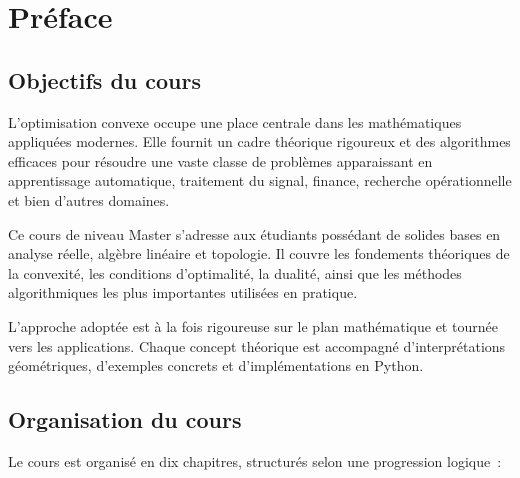 \chapter*{Pr\'eface}

\section*{Objectifs du cours}

L'optimisation convexe occupe une place centrale dans les math\'ematiques appliqu\'ees
modernes. Elle fournit un cadre th\'eorique rigoureux et des algorithmes efficaces pour
r\'esoudre une vaste classe de probl\`emes apparaissant en apprentissage automatique,
traitement du signal, finance, recherche op\'erationnelle et bien d'autres domaines.

Ce cours de niveau Master s'adresse aux \'etudiants poss\'edant de solides bases en
analyse r\'eelle, alg\`ebre lin\'eaire et topologie. Il couvre les fondements th\'eoriques
de la convexit\'e, les conditions d'optimalit\'e, la dualit\'e, ainsi que les m\'ethodes
algorithmiques les plus importantes utilis\'ees en pratique.

L'approche adopt\'ee est \`a la fois rigoureuse sur le plan math\'ematique et tourn\'ee vers
les applications. Chaque concept th\'eorique est accompagn\'e d'interpr\'etations
g\'eom\'etriques, d'exemples concrets et d'impl\'ementations en Python.

\section*{Organisation du cours}

Le cours est organis\'e en dix chapitres, structur\'es selon une progression logique~:

